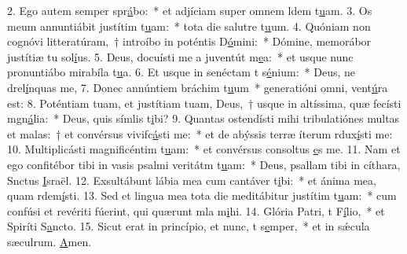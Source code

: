 2. Ego autem semper spr\uline{á}bo:~* et adjíciam super omnem ldem t\uline{u}am.
3. Os meum annuntiábit justítim t\uline{u}am:~* tota die salutre t\uline{u}um.
4. Quóniam non cognóvi litteratúram,~† introíbo in poténtis D\uline{ó}mini:~* Dómine, memorábor justítiæ tu sol\uline{í}us.
5. Deus, docuísti me a juventút m\uline{e}a:~* et usque nunc pronuntiábo mirabíla t\uline{u}a.
6. Et usque in senéctam t s\uline{é}nium:~* Deus, ne drel\uline{í}nquas me,
7. Donec annúntiem bráchim t\uline{u}um~* generatióni omni,  vent\uline{ú}ra est:
8. Poténtiam tuam, et justítiam tuam, Deus,~† usque in altíssima, quæ fecísti mgn\uline{á}lia:~* Deus, quis símlis t\uline{i}bi?
9. Quantas ostendísti mihi tribulatiónes multas et malas:~† et convérsus vivifc\uline{á}sti me:~* et de abýssis terræ íterum rdux\uline{í}sti me:
10. Multiplicásti magnificéntim t\uline{u}am:~* et convérsus consoltus \uline{e}s me.
11. Nam et ego confitébor tibi in vasis psalmi veritátm t\uline{u}am:~* Deus, psallam tibi in cíthara, Snctus \uline{I}sraël.
12. Exsultábunt lábia mea cum cantáver t\uline{i}bi:~* et ánima mea, quam rdem\uline{í}sti.
13. Sed et lingua mea tota die meditábitur justítim t\uline{u}am:~* cum confúsi et revériti fúerint, qui quærunt mla m\uline{i}hi.
14. Glória Patri, t F\uline{í}lio,~* et Spiríti S\uline{a}ncto.
15. Sicut erat in princípio, et nunc, t s\uline{e}mper,~* et in sǽcula sæculrum. \uline{A}men.
